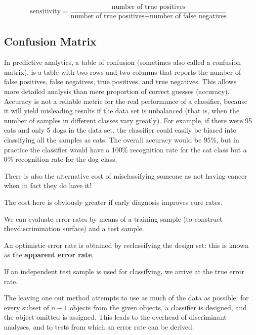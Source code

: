 \documentclass[12pt]{article} %
\begin{document}
\[ \mbox{sensitivity} = \frac{ \mbox{number of true positives} } {\mbox{number of true positives} + \mbox{number of false negatives}} \]


\subsection*{Confusion Matrix}

In predictive analytics, a table of confusion (sometimes also called a confusion matrix), is a table with two rows and two columns that reports the number of false positives, false negatives, true positives, and true negatives. This allows more detailed analysis than mere proportion of correct guesses (accuracy). Accuracy is not a reliable metric for the real performance of a classifier, because it will yield misleading results if the data set is unbalanced (that is, when the number of samples in different classes vary greatly). For example, if there were 95 cats and only 5 dogs in the data set, the classifier could easily be biased into classifying all the samples as cats. The overall accuracy would be 95\%, but  in practice the classifier would have a 100\% recognition rate for the cat class but a 0\% recognition rate for the dog class.

%

There is also the alternative cost of misclassifying someone as not having cancer when in fact they do have it! 

The cost here is obviously greater if early diagnosis improves cure rates.


We can evaluate error rates by means of a training sample (to construct thevdiscrimination surface) and a test sample.

An optimistic error rate is obtained by reclassifying the design set: this is known as the \textbf{apparent error rate}.

If an independent test sample is used for classifying, we arrive at the true error rate.

The leaving one out method attempts to use as much of the data as possible: for every subset of $n-1$ objects from the given objects, a classifier is designed, 
and the object omitted is assigned. This leads to the overhead of discriminant analyses, and to tests from which an error rate can be derived.
\end{document}
